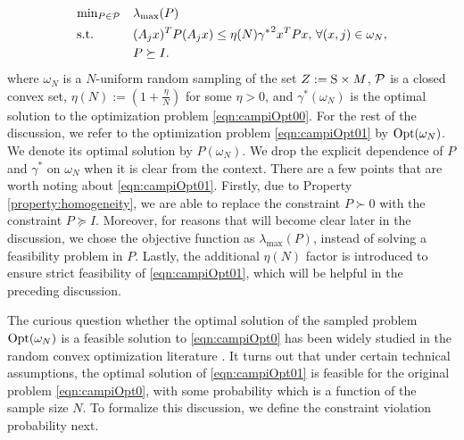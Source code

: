 \begin{equation}\label{eqn:campiOpt01}
\begin{aligned}
& \text{min}_{P \in \mathcal{P}} & & \lambda_{\max}(P) \\
& \text{s.t.} 
&  & (A_j x)^TP(A_j x) \leq {\eta(N) \gamma^*}^2 x^TPx,\,\forall (x, j) \in \omega_N, \\
& && P \succeq I. \\
\end{aligned}
\end{equation}
where $\omega_N$ is a $N$-uniform random sampling of the set \mbox{$Z:=\text{S} \times M$}, $\mathcal{P}$ is a closed convex set, $\eta(N):=\left(1+\frac{\eta}{N}\right)$ for some $\eta > 0$, and $\gamma^*(\omega_N)$ is the optimal solution to the optimization problem \eqref{eqn:campiOpt00}. For the rest of the discussion, we refer to the optimization problem \eqref{eqn:campiOpt01} by $ \text{Opt}(\omega_N)$. We denote its optimal solution by $P(\omega_N)$. We drop the explicit dependence of $P$ and $\gamma^*$ on $\omega_N$ when it is clear from the context. There are a few points that are worth noting about \eqref{eqn:campiOpt01}. Firstly, due to Property \ref{property:homogeneity}, we are able to replace the constraint $P \succ 0$ with the constraint $P \succeq I$. Moreover, for reasons that will become clear later in the discussion, we chose the objective function as $\lambda_{\max}(P)$, instead of solving a feasibility problem in $P$. Lastly, the additional $\eta(N)$ factor is introduced to ensure strict feasibility of \eqref{eqn:campiOpt01}, which will be helpful in the preceding discussion.

The curious question whether the optimal solution of the sampled problem $\text{Opt}(\omega_N)$ is a feasible solution to \eqref{eqn:campiOpt0} has been widely studied in the random convex optimization literature \cite{campi}. It turns out that under certain technical assumptions, the optimal solution of \eqref{eqn:campiOpt01} is feasible for the original problem \eqref{eqn:campiOpt0}, with some probability which is a function of the sample size $N$. To formalize this discussion, we define the constraint violation probability next.

